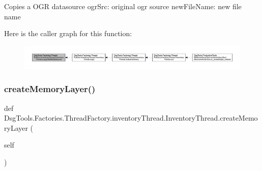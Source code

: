 \begin{DoxyVerb}Copies a OGR datasource
ogrSrc: original ogr source
newFileName: new file name
\end{DoxyVerb}
 Here is the caller graph for this function\+:
\nopagebreak
\begin{figure}[H]
\begin{center}
\leavevmode
\includegraphics[width=350pt]{class_dsg_tools_1_1_factories_1_1_thread_factory_1_1inventory_thread_1_1_inventory_thread_acbdf2851ff289aae0cd231501bec641b_icgraph}
\end{center}
\end{figure}
\mbox{\label{class_dsg_tools_1_1_factories_1_1_thread_factory_1_1inventory_thread_1_1_inventory_thread_ab791655b05235f3a4f0c57708d057371}} 
\subsubsection{\texorpdfstring{create\+Memory\+Layer()}{createMemoryLayer()}}
{\footnotesize\ttfamily def Dsg\+Tools.\+Factories.\+Thread\+Factory.\+inventory\+Thread.\+Inventory\+Thread.\+create\+Memory\+Layer (\begin{DoxyParamCaption}\item[{}]{self }\end{DoxyParamCaption})}


